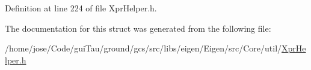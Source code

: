 Definition at line 224 of file Xpr\-Helper.\-h.



The documentation for this struct was generated from the following file\-:\begin{DoxyCompactItemize}
\item 
/home/jose/\-Code/gui\-Tau/ground/gcs/src/libs/eigen/\-Eigen/src/\-Core/util/\hyperlink{_xpr_helper_8h}{Xpr\-Helper.\-h}\end{DoxyCompactItemize}
